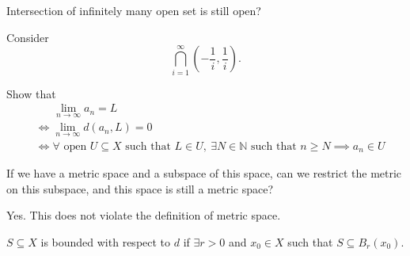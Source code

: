 \begin{eg}
    Intersection of infinitely many open set is still open? 
\end{eg}
\begin{explanation}
    Consider 
    \[
        \bigcap_{i=1}^{\infty} \left( -\frac{1}{i}, \frac{1}{i} \right). 
    \]
\end{explanation}

\begin{exercise}
    Show that 
    \begin{align*}
        &\phantom{.=}\lim_{n \to \infty} a_n = L \\
        &\iff \lim_{n \to \infty} d(a_n, L) = 0 \\
        &\iff \forall \text{ open } U \subseteq  X \text{ such that } L \in U, \ \exists N \in \mathbb{N} \text{ such that }  n \ge N \implies a_n \in U
    \end{align*}
\end{exercise}

\begin{eg}
    If we have a metric space and a subspace of this space, can we restrict the metric on this subspace, and this space is still a metric space?
\end{eg}
\begin{explanation}
Yes. This does not violate the definition of metric space.
\end{explanation}

\begin{definition}
    \(S \subseteq X\) is bounded with respect to \(d\) if \(\exists r>0\) and \(x_0 \in X\) such that \(S \subseteq B_r(x_0)\).     
\end{definition}


